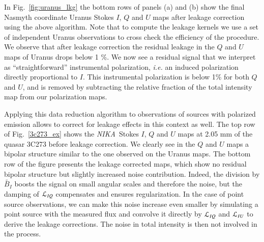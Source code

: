 \documentclass[twocolumn, traditabstract]{aa}
\newcommand{\nika}{{\it NIKA}}
\begin{document}
 In Fig.~\ref{fig:uranus_lkg} the bottom rows of panels (a) and (b) show the
 final Nasmyth coordinate Uranus Stokes $I$, $Q$ and $U$ maps after leakage
 correction using the above algorithm. Note that to compute the leakage kernels
 we use a set of independent Uranus observations to cross check the efficiency of
 the procedure.  We observe that after leakage correction the residual leakage in
 the $Q$ and $U$ maps of Uranus drops below 1 \%. We now see a residual
 signal that we interpret as ``straightforward'' instrumental polarization,
 {\it i.e.} an induced polarization directly proportional to $I$. This instrumental
 polarization is below 1\% for both $Q$ and $U$, and is removed
 by subtracting the relative fraction of the total intensity map from
 our polarization maps.

Applying this data reduction algorithm to observations of sources with polarized
emission allows to correct for leakage effects in this context as well. The top
row of Fig.~\ref{3c273_ex} shows the \nika\ Stokes $I$, $Q$ and $U$ maps at 2.05
mm of the quasar 3C273 before leakage correction. We clearly see in the $Q$ and
$U$ maps a bipolar structure similar to the one observed on the Uranus maps. The
bottom row of the figure presents the leakage corrected maps, which show no
residual bipolar structure but slightly increased noise contribution. Indeed,
the division by $\tilde{B_I}$ boosts the signal on small angular scales and
therefore the noise, but the damping of ${\cal{L}}_{IQ}$ compensates and ensures
regularization. In the case of point source observations, we can make this noise
increase even smaller by simulating a point source with the measured flux and
convolve it directly by ${\cal{L}}_{IQ}$ and ${\cal{L}}_{IU}$ to derive the
leakage corrections. The noise in total intensity is then not involved in the
process.
\end{document}
